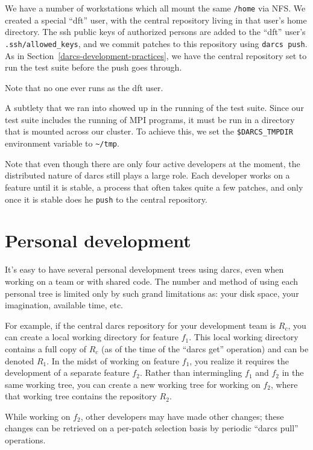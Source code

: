 We have a number of workstations which all mount the same \verb!/home! via NFS.
We created a special ``dft'' user, with the central repository living in that
user's home directory.  The ssh public keys of authorized persons are added to
the ``dft'' user's \verb!.ssh/allowed_keys!, and we commit patches to this
repository using
\verb'darcs push'.  As in Section~\ref{darcs-development-practices},
we have the central repository set to run the test suite before the push goes
through.

Note that no one ever runs as the dft user.

A subtlety that we ran into showed up in the running of the test suite.
Since our test suite includes the running of MPI programs, it must be run
in a directory that is mounted across our cluster.  To achieve this, we set
the \verb!$DARCS_TMPDIR! %
environment variable to \verb!~/tmp!.

Note that even though there are only four active developers at the moment,
the distributed nature of darcs still plays a large role.  Each developer
works on a feature until it is stable, a process that often takes quite a
few patches, and only once it is stable does he
\verb'push' to the central repository.

\section{Personal development}

It's easy to have several personal development trees using darcs, even
when working on a team or with shared code.  The number and method of
using each personal tree is limited only by such grand limitations as:
your disk space, your imagination, available time, etc.

For example, if the central darcs repository for your development team
is $R_{c}$, you can create a local working directory for feature
$f_1$.  This local working directory contains a full copy of $R_c$
(as of the time of the ``darcs get'' operation) and can be denoted
$R_1$.  In the midst of working on feature $f_1$, you realize it
requires the development of a separate feature $f_2$.  Rather than
intermingling $f_1$ and $f_2$ in the same working tree, you can create
a new working tree for working on $f_2$, where that working tree
contains the repository $R_2$.

While working on $f_2$, other developers may have made other changes;
these changes can be retrieved on a per-patch selection basis by
periodic ``darcs pull'' operations.

